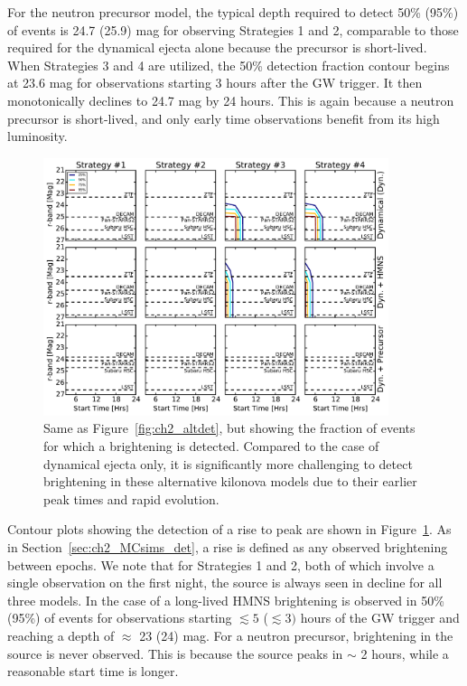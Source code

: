 For the neutron precursor model, the typical depth required to detect 50\% (95\%) of events is 24.7 (25.9) mag for observing Strategies 1 and 2, comparable to those required for the dynamical ejecta alone because the precursor is short-lived. When Strategies 3 and 4 are utilized, the 50\% detection fraction contour begins at 23.6 mag for observations starting 3 hours after the GW trigger. It then monotonically declines to 24.7 mag by 24 hours. This is again because a neutron precursor is short-lived, and only early time observations benefit from its high luminosity.

\begin{figure}[t!]
\centering
\includegraphics[width=0.9\textwidth]{./figs/chapter2/ch2_f20.pdf}
\caption{Same as Figure~\ref{fig:ch2_altdet}, but showing the fraction of events for which a brightening is detected. Compared to the case of dynamical ejecta only, it is significantly more challenging to detect brightening in these alternative kilonova models due to their earlier peak times and rapid evolution.}
\label{fig:ch2_altrise}
\end{figure}

Contour plots showing the detection of a rise to peak are shown in Figure~\ref{fig:ch2_altrise}. As in Section~\ref{sec:ch2_MCsims_det}, a rise is defined as any observed brightening between epochs. We note that for Strategies 1 and 2, both of which involve a single observation on the first night, the source is always seen in decline for all three models. In the case of a long-lived HMNS brightening is observed in 50\% (95\%) of events for observations starting $\lesssim5$ ($\lesssim 3)$ hours of the GW trigger and reaching a depth of $\approx$ 23 (24) mag. For a neutron precursor, brightening in the source is never observed. This is because the source peaks in $\sim$ 2 hours, while a reasonable start time is longer.

